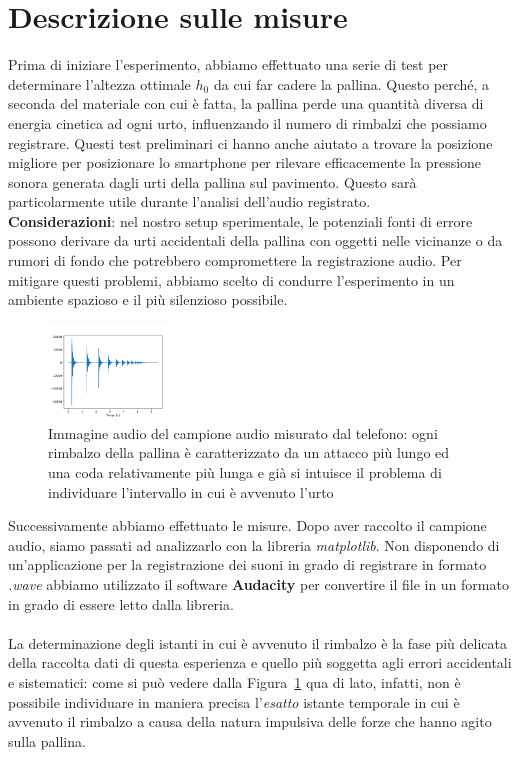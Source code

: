 \documentclass{article}
\begin{document}
\section{Descrizione sulle misure}
Prima di iniziare l'esperimento, abbiamo effettuato una serie di test per determinare l'altezza ottimale $h_0$ da cui far cadere la pallina. Questo perché, a seconda del materiale con cui è fatta, la pallina perde una quantità diversa di energia cinetica ad ogni urto, influenzando il numero di rimbalzi che possiamo registrare. Questi test preliminari ci hanno anche aiutato a trovare la posizione migliore per posizionare lo smartphone per rilevare efficacemente la pressione sonora generata dagli urti della pallina sul pavimento. Questo sarà particolarmente utile durante l'analisi dell'audio registrato. \\
\textbf{Considerazioni}: nel nostro setup sperimentale, le potenziali fonti di errore possono derivare da urti accidentali della pallina con oggetti nelle vicinanze o da rumori di fondo che potrebbero compromettere la registrazione audio. Per mitigare questi problemi, abbiamo scelto di condurre l'esperimento in un ambiente spazioso e il più silenzioso possibile.
\begin{figure}
	\vspace{-1cm}
	\centering
	\includegraphics[width=0.3\textwidth, scale=0.1]{Grafico_rimbalzo.pdf}
	\caption{Immagine audio del campione audio misurato dal telefono: ogni rimbalzo della pallina è caratterizzato da un attacco più lungo ed una coda relativamente più lunga e già si intuisce il problema di individuare l'intervallo in cui è avvenuto l'urto}
	\label{fig:audio}
\end{figure}
\noindent Successivamente abbiamo effettuato le misure. Dopo aver raccolto il campione audio, siamo passati ad analizzarlo con la libreria \emph{matplotlib}. Non disponendo di un'applicazione per la registrazione dei suoni in grado di registrare in formato \emph{.wave} abbiamo utilizzato il software \textbf{Audacity} per convertire il file in un formato in grado di essere letto dalla libreria. \\ \\ \clearpage
\noindent La determinazione degli istanti in cui è avvenuto il rimbalzo è la fase più delicata della raccolta dati di questa esperienza e quello più soggetta agli errori accidentali e sistematici: come si può vedere dalla Figura~\ref{fig:audio} qua di lato, infatti, non è possibile individuare in maniera precisa l'\emph{esatto} istante temporale in cui è avvenuto il rimbalzo a causa della natura impulsiva delle forze che hanno agito sulla pallina.
\end{document}
